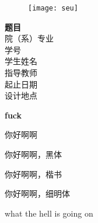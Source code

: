 \documentclass[a4paper, 12pt]{article}
\begin{document}
\begin{figure}[H]
\centering
\texttt{[image: seu]}
\end{figure}
\vspace{26pt}

\begin{center}
\Large
\textbf{题目} \quad \underline{}\\
\underline{}院（系）\quad \underline{}专业 \\
学\qquad 号 \underline{}\\
学生姓名 \underline{}\\
指导教师 \underline{}\\
起止日期 \underline{}\\
设计地点 \underline{}

\end{center}
\newpage








\textbf{fuck}

\bigskip
你好啊啊

{\heiti 你好啊啊，黑体}

{\kaishu 你好啊啊，楷书}

{\mlu 你好啊啊，细明体}

what the hell is going on 
\end{document}
